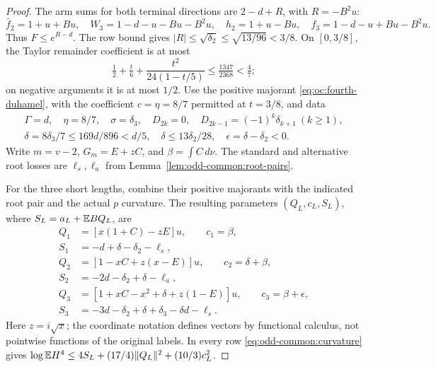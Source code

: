 \begin{proof}
The arm sums for both terminal directions are \(2-d+R\), with
\(R=-B^2u\):
\[
 \bar f_2=1+u+Bu,\quad W_3=1-d-u-Bu-B^2u,
 \quad h_2=1+u-Bu,\quad f_3=1-d-u+Bu-B^2u.
\]
Thus \(F\le e^{R-d}\). The row bound gives
\(|R|\le\sqrt{\delta_2}\le\sqrt{13/96}<3/8\).
On \([0,3/8]\), the Taylor remainder coefficient is at most
\[
 \tfrac12+\tfrac t6+\frac{t^2}{24(1-t/5)}
 \le\tfrac{1347}{2368}<\tfrac47;
\]
on negative arguments it is at most \(1/2\).
Use the positive majorant \eqref{eq:oc:fourth-duhamel}, with the
coefficient \(c=\eta=8/7\) permitted at \(t=3/8\), and data
\begin{equation}\label{eq:odd168:terminal-data}
\begin{gathered}
 \Gamma=d,\quad\eta=8/7,\quad\sigma=\delta_3,
 \quad D_{2k}=0,\quad D_{2k-1}=(-1)^k\delta_{k+1}\ (k\ge1),\\
 \delta=8\delta_3/7\le169d/896<d/5,
 \quad\delta\le13\delta_2/28,
 \quad\epsilon=\delta-\delta_2<0.
\end{gathered}
\end{equation}
Write \(m=v-2\), \(G_m=E+zC\), and \(\beta=\int C\,d\nu\).
The standard and alternative root losses are \(\ell_s,\ell_a\)
from Lemma~\ref{lem:odd-common:root-pairs}.

For the three short lengths, combine their positive majorants with
the indicated root pair and the actual \(p\) curvature. The resulting
parameters \((Q_L,c_L,S_L)\), where \(S_L=a_L+\mathbb E BQ_L\), are
\begin{equation}\label{eq:odd168:short-parameters}
\begin{aligned}
 Q_1&=[x(1+C)-zE]u,\qquad c_1=\beta,\\
 S_1&=-d+\delta-\delta_2-\ell_s,\\[2pt]
 Q_2&=[1-xC+z(x-E)]u,\qquad c_2=\delta+\beta,\\
 S_2&=-2d-\delta_2+\delta-\ell_a,\\[2pt]
 Q_3&=[1+xC-x^2+\delta+z(1-E)]u,\qquad c_3=\beta+\epsilon,\\
 S_3&=-3d-\delta_2+\delta+\delta_3-\delta d-\ell_s.
\end{aligned}
\end{equation}
Here \(z=i\sqrt x\); the coordinate notation defines vectors by
functional calculus, not pointwise functions of the original labels.
In every row \eqref{eq:odd-common:curvature} gives
\(\log\mathbb E H^4\le4S_L+(17/4)\|Q_L\|^2+(10/3)c_L^2\).


\end{proof}
